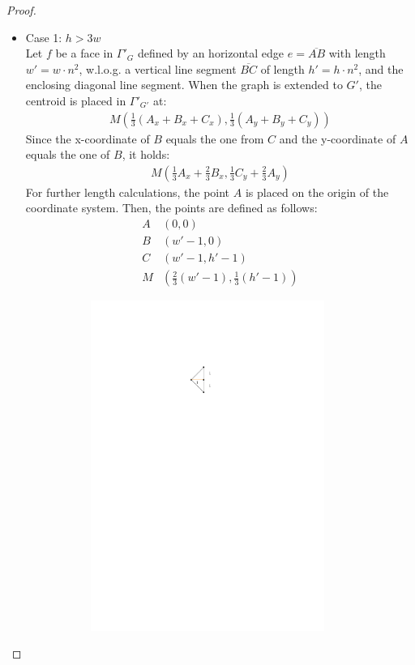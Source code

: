\begin{proof}
	\begin{itemize}
		\item Case 1: $h > 3w$\\		
		Let $f$ be a face in $\Gamma'_G$ defined by an horizontal edge $e = \overline{AB}$ with length $w' = w\cdot n^2$, w.l.o.g. a vertical line segment $\overline{BC}$ of length $h'=h\cdot n^2$, and the enclosing diagonal line segment. When the graph is extended to $G'$, the centroid is placed in $\Gamma'_{G'}$ at:
		\begin{align*}
			M\left(\frac{1}{3}(A_x+B_x+C_x) , \frac{1}{3}(A_y+B_y+C_y) \right)
		\end{align*}
		Since the x-coordinate of $B$ equals the one from $C$ and the y-coordinate of $A$ equals the one of $B$, it holds:
		\begin{align*}
			M\left(\frac{1}{3}A_x+\frac{2}{3}B_x , \frac{1}{3}C_y+\frac{2}{3}A_y \right)
		\end{align*}
		For further length calculations, the point $A$ is placed on the origin of the coordinate system. Then, the points are defined as follows:
		\begin{align*}
			A&(0,0)\\
			B&(w'-1,0)\\
			C&(w'-1,h'-1)\\
			M&\left(\frac{2}{3}(w'-1),\frac{1}{3}(h'-1)\right)
		\end{align*}
		\begin{figure}[H]
			\centering
			\begin{subfigure}{0.8\linewidth}
				\centering
				\includegraphics[width=0.9\textwidth,page=10]{drawings/maximal_planar.pdf}

\end{subfigure}
\end{figure}
\end{itemize}
\end{proof}
